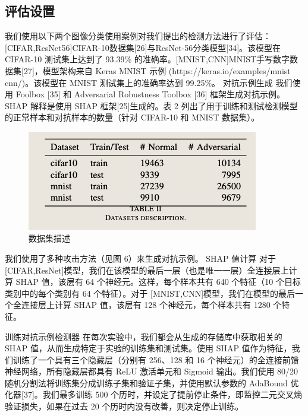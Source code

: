 \documentclass[12pt, a4paper]{ctexart} %
\begin{document}
\subsection{评估设置}
我们使用以下两个图像分类使用案例对我们提出的检测方法进行了评估： [CIFAR,ResNet56]CIFAR-10数据集[26]与ResNet-56分类模型[34]。该模型在 CIFAR-10 测试集上达到了 93.39\% 的准确率。[MNIST,CNN]MNIST手写数字数据集[27]，模型架构来自 Keras MNIST 示例 (https://keras.io/examples/mnist cnn/)。该模型在 MNIST 测试集上的准确率达到 99.25\%。 对抗示例生成 我们使用 Foolbox [35] 和 Adversarial Robustness Toolbox [36] 框架生成对抗示例。SHAP 解释是使用 SHAP 框架[25]生成的。表 2 列出了用于训练和测试检测模型的正常样本和对抗样本的数量（针对 CIFAR-10 和 MNIST 数据集）。
\begin{figure}[H]
    \centering
    \includegraphics[width=0.9\textwidth]{img/adversaries_6.png}
    \caption{数据集描述}
\end{figure}
我们使用了多种攻击方法（见图 6）来生成对抗示例。 SHAP 值计算 对于 [CIFAR,ResNet]模型，我们在该模型的最后一层（也是唯一一层）全连接层上计算 SHAP 值，该层有 64 个神经元。这样，每个样本共有 640 个特征（10 个目标类别中的每个类别有 64 个特征）。对于 [MNIST,CNN]模型，我们在模型的最后一个全连接层上计算 SHAP 值，该层有 128 个神经元，每个样本共有 1280 个特征。

训练对抗示例检测器 在每次实验中，我们都会从生成的存储库中获取相关的 SHAP 值，从而生成特定于实验的训练集和测试集。使用 SHAP 值作为特征，我们训练了一个具有三个隐藏层（分别有 256、128 和 16 个神经元）的全连接前馈神经网络，所有隐藏层都具有 ReLU 激活单元和 Sigmoid 输出。我们使用 80/20 随机分割法将训练集分成训练子集和验证子集，并使用默认参数的 AdaBound 优化器[37]。我们最多训练 500 个历时，并设定了提前停止条件，即监控二元交叉熵验证损失，如果在过去 20 个历时内没有改善，则决定停止训练。
\end{document}
